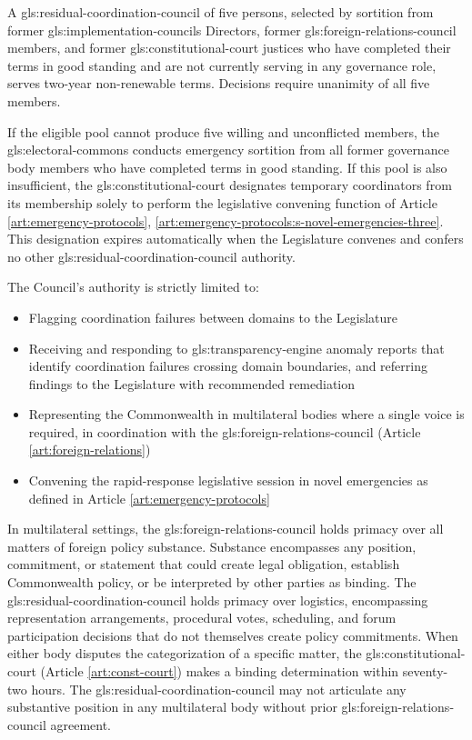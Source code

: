 
A \gls{gls:residual-coordination-council} of five persons, selected by sortition from former \gls{gls:implementation-councils} Directors, former \gls{gls:foreign-relations-council} members, and former \gls{gls:constitutional-court} justices who have completed their terms in good standing and are not currently serving in any governance role, serves two-year non-renewable terms. Decisions require unanimity of all five members.

If the eligible pool cannot produce five willing and unconflicted members, the \gls{gls:electoral-commons} conducts emergency sortition from all former governance body members who have completed terms in good standing. If this pool is also insufficient, the \gls{gls:constitutional-court} designates temporary coordinators from its membership solely to perform the legislative convening function of Article \ref{art:emergency-protocols}, \ref{art:emergency-protocols:s-novel-emergencies-three}. This designation expires automatically when the Legislature convenes and confers no other \gls{gls:residual-coordination-council} authority.

The Council's authority is strictly limited to:
\begin{itemize}
  \item Flagging coordination failures between domains to the Legislature
  \item Receiving and responding to \gls{gls:transparency-engine} anomaly reports that identify coordination failures crossing domain boundaries, and referring findings to the Legislature with recommended remediation
  \item Representing the Commonwealth in multilateral bodies where a single voice is required, in coordination with the \gls{gls:foreign-relations-council} (Article \ref{art:foreign-relations})
  \item Convening the rapid-response legislative session in novel emergencies as defined in Article \ref{art:emergency-protocols}
\end{itemize}

In multilateral settings, the \gls{gls:foreign-relations-council} holds primacy over all matters of foreign policy substance. Substance encompasses any position, commitment, or statement that could create legal obligation, establish Commonwealth policy, or be interpreted by other parties as binding. The \gls{gls:residual-coordination-council} holds primacy over logistics, encompassing representation arrangements, procedural votes, scheduling, and forum participation decisions that do not themselves create policy commitments. When either body disputes the categorization of a specific matter, the \gls{gls:constitutional-court} (Article \ref{art:const-court}) makes a binding determination within seventy-two hours. The \gls{gls:residual-coordination-council} may not articulate any substantive position in any multilateral body without prior \gls{gls:foreign-relations-council} agreement.

